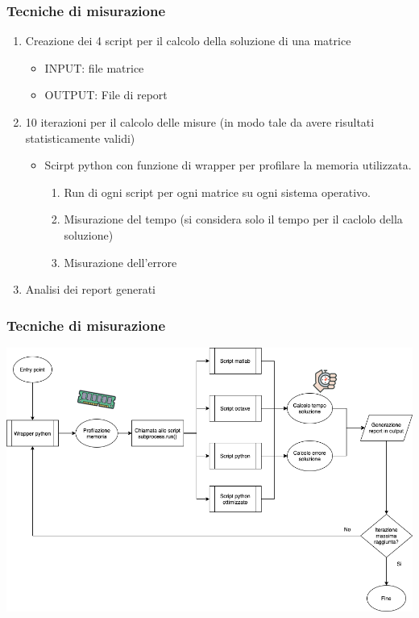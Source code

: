 \documentclass{beamer}
\begin{document}
\begin{frame}
	
	\frametitle{Tecniche di misurazione}
		\begin{enumerate}
		\item Creazione dei 4 script per il calcolo della soluzione di una matrice
		\begin{itemize}
			\item INPUT: file matrice
			\item OUTPUT: File di report
		\end{itemize}

		\item 10 iterazioni per il calcolo delle misure (in modo tale da avere risultati statisticamente validi)
	
		\begin{itemize}
			\item Scirpt python con funzione di wrapper per profilare la memoria utilizzata.
			\begin{enumerate}
				\item Run di ogni script per ogni matrice su ogni sistema operativo.

					\item Misurazione del tempo (si considera solo il tempo per il caclolo della soluzione)
					\item Misurazione dell'errore 

			\end{enumerate}
			
		\end{itemize}


		\item Analisi dei report generati				

	\end{enumerate}
\end{frame}


\begin{frame}
	
	\frametitle{Tecniche di misurazione}
	
	\includegraphics[height=0.6\textwidth]{assets/execution_workflow.png}
	
\end{frame}
\end{document}

